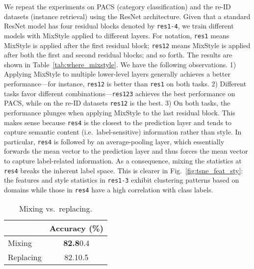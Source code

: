 \documentclass{article} \usepackage{iclr2021_conference,times}
\makeatletter
\renewcommand\paragraph{\@startsection{paragraph}{4}{\z@}{.1em \@plus1ex \@minus.2ex}{-.5em}{\normalfont\normalsize\bfseries}}
\newcommand{\tableCellHeight}{1}
\newcommand{\tabstyle}[1]{
  \setlength{\tabcolsep}{#1}
  \renewcommand{\arraystretch}{\tableCellHeight}
  \centering
}
\makeatother
\begin{document}
\paragraph{Where to apply MixStyle?}
We repeat the experiments on PACS (category classification) and the re-ID datasets (instance retrieval) using the ResNet architecture. Given that a standard ResNet model has four residual blocks denoted by \texttt{res1-4}, we train different models with MixStyle applied to different layers. For notation, \texttt{res1} means MixStyle is applied after the first residual block; \texttt{res12} means MixStyle is applied after both the first and second residual blocks; and so forth. The results are shown in Table~\ref{tab:where_mixstyle}. We have the following observations. 1) Applying MixStyle to multiple lower-level layers generally achieves a better performance---for instance, \texttt{res12} is better than \texttt{res1} on both tasks. 2) Different tasks favor different combinations---\texttt{res123} achieves the best performance on PACS, while on the re-ID datasets \texttt{res12} is the best. 3) On both tasks, the performance plunges when applying MixStyle to the last residual block. This makes sense because \texttt{res4} is the closest to the prediction layer and tends to capture semantic content (i.e.~label-sensitive) information rather than style. In particular, \texttt{res4} is followed by an average-pooling layer, which essentially forwards the mean vector to the prediction layer and thus forces the mean vector to capture label-related information. As a consequence, mixing the statistics at \texttt{res4} breaks the inherent label space. This is clearer in Fig.~\ref{fig:tsne_feat_sty}: the features and style statistics in \texttt{res1-3} exhibit clustering patterns based on domains while those in \texttt{res4} have a high correlation with class labels.
\vspace{1em}

\begin{wraptable}{r}{.3\textwidth}
\vspace{-.5cm}
\tabstyle{5pt}
\caption{Mixing vs.~replacing.}
\label{tab:mix_vs_replace}
\begin{tabular}{lc}
\hline
 & Accuracy (\%) \\
\hline \hline
Mixing & \textbf{82.8}0.4 \\
Replacing & 82.10.5 \\
\hline
\end{tabular}
\vspace{-.5cm}
\end{wraptable}
\end{document}
